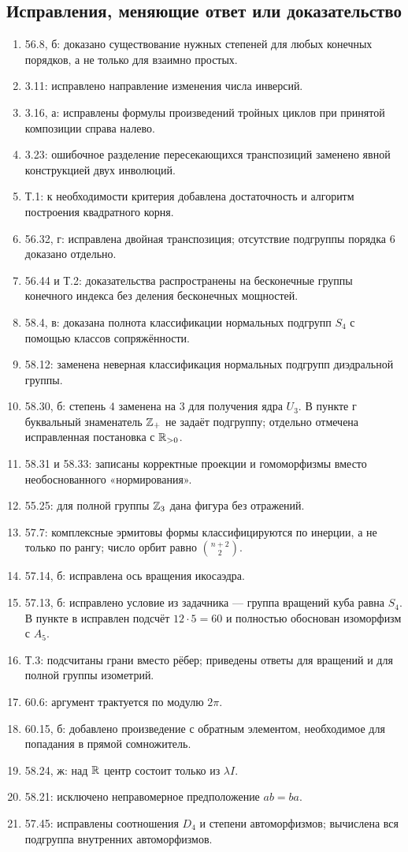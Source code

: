 \subsection*{Исправления, меняющие ответ или доказательство}
\begin{enumerate}
\item 56.8, б: доказано существование нужных степеней для любых
 конечных порядков, а не только для взаимно простых.
\item 3.11: исправлено направление изменения числа инверсий.
\item 3.16, а: исправлены формулы произведений тройных циклов
 при принятой композиции справа налево.
\item 3.23: ошибочное разделение пересекающихся транспозиций
 заменено явной конструкцией двух инволюций.
\item Т.1: к необходимости критерия добавлена достаточность
 и алгоритм построения квадратного корня.
\item 56.32, г: исправлена двойная транспозиция; отсутствие
 подгруппы порядка $6$ доказано отдельно.
\item 56.44 и Т.2: доказательства распространены на бесконечные
 группы конечного индекса без деления бесконечных мощностей.
\item 58.4, в: доказана полнота классификации нормальных подгрупп
 $S_4$ с помощью классов сопряжённости.
\item 58.12: заменена неверная классификация нормальных
 подгрупп диэдральной группы.
\item 58.30, б: степень $4$ заменена на $3$ для получения ядра $U_3$.
 В пункте г буквальный знаменатель $\mathbb{Z}_+$ не задаёт подгруппу;
 отдельно отмечена исправленная постановка с $\mathbb{R}_{>0}$.
\item 58.31 и 58.33: записаны корректные проекции и
 гомоморфизмы вместо необоснованного «нормирования».
\item 55.25: для полной группы $\mathbb{Z}_3$ дана фигура без отражений.
\item 57.7: комплексные эрмитовы формы классифицируются по инерции,
 а не только по рангу; число орбит равно $\binom{n+2}{2}$.
\item 57.14, б: исправлена ось вращения икосаэдра.
\item 57.13, б: исправлено условие из задачника --- группа вращений
 куба равна $S_4$. В пункте в исправлен подсчёт $12\cdot5=60$
 и полностью обоснован изоморфизм с $A_5$.
\item Т.3: подсчитаны грани вместо рёбер; приведены ответы
 для вращений и для полной группы изометрий.
\item 60.6: аргумент трактуется по модулю $2\pi$.
\item 60.15, б: добавлено произведение с обратным элементом,
 необходимое для попадания в прямой сомножитель.
\item 58.24, ж: над $\mathbb{R}$ центр состоит только из $\lambda I$.
\item 58.21: исключено неправомерное предположение $ab=ba$.
\item 57.45: исправлены соотношения $D_4$ и степени автоморфизмов;
 вычислена вся подгруппа внутренних автоморфизмов.
\end{enumerate}

